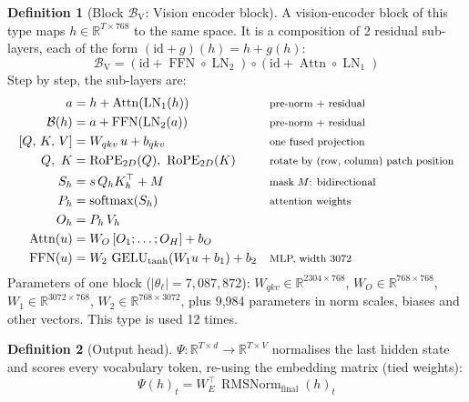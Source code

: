 \documentclass[10pt,a4paper]{article}
\newcommand{\op}[1]{\operatorname{#1}}
\theoremstyle{definition}
\newtheorem{definition}{Definition}[section]
\begin{document}
\begin{definition}[Block $\mathcal{B}_{\mathrm{V}}$: Vision encoder block]
A vision-encoder block of this type maps $h\in\mathbb{R}^{T\times 768}$ to the same space. It is a composition of 2 residual sub-layers, each of the form $(\mathrm{id}+g)(h)=h+g(h)$:
\begin{equation}
  \mathcal{B}_{\mathrm{V}} = (\mathrm{id}+\op{FFN}\circ \op{LN}_{2})\circ(\mathrm{id}+\op{Attn}\circ \op{LN}_{1})
\end{equation}
Step by step, the sub-layers are:
\begin{align*}
  a &= h + \op{Attn}(\op{LN}_{1}(h)) && \text{\footnotesize pre-norm + residual} \\
  \mathcal{B}(h) &= a + \op{FFN}(\op{LN}_{2}(a)) && \text{\footnotesize pre-norm + residual} \\
  [Q,\,K,\,V] &= W_{qkv}\,u + b_{qkv} && \text{\footnotesize one fused projection} \\
  Q,\ K &= \op{RoPE}_{2D}(Q),\ \op{RoPE}_{2D}(K) && \text{\footnotesize rotate by (row, column) patch position} \\
  S_h &= s\, Q_h K_h^{\top} + M && \text{\footnotesize mask $M$: bidirectional} \\
  P_h &= \op{softmax}(S_h) && \text{\footnotesize attention weights} \\
  O_h &= P_h\, V_h \\
  \op{Attn}(u) &= W_O\,[O_1;\dots;O_H] + b_O \\
  \op{FFN}(u) &= W_2\,\op{GELU}_{\tanh}(W_1 u + b_1) + b_2 && \text{\footnotesize MLP, width 3072}
\end{align*}
Parameters of one block ($|\theta_\ell|=7{,}087{,}872$): $W_{qkv}\in\mathbb{R}^{2304\times768}$, $W_O\in\mathbb{R}^{768\times768}$, $W_1\in\mathbb{R}^{3072\times768}$, $W_2\in\mathbb{R}^{768\times3072}$, plus 9,984 parameters in norm scales, biases and other vectors. This type is used 12 times.
\end{definition}
\begin{definition}[Output head]
$\Psi:\mathbb{R}^{T\times d}\to\mathbb{R}^{T\times V}$ normalises the last hidden state and scores every vocabulary token, re-using the embedding matrix (tied weights):
\begin{equation}
  \Psi(h)_t = W_E^{\top}\,\op{RMSNorm}_{\mathrm{final}}(h)_t
\end{equation}
\end{definition}
\end{document}
